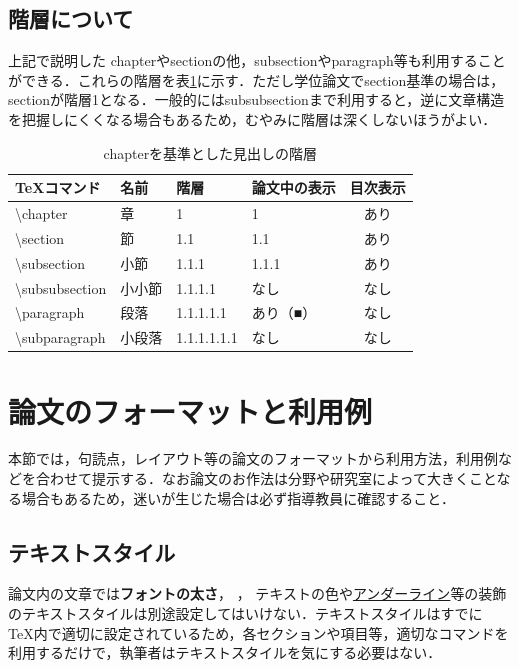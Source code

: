 \documentclass[a4paper,uplatex]{jsarticle}
\begin{document}
\subsection{階層について}
上記で説明した chapterやsectionの他，subsectionやparagraph等も利用することができる．これらの階層を表\ref{tab:kaisou}に示す．ただし学位論文でsection基準の場合は，sectionが階層1となる．一般的にはsubsubsectionまで利用すると，逆に文章構造を把握しにくくなる場合もあるため，むやみに階層は深くしないほうがよい．

\begin{table}[t]
  \caption{chapterを基準とした見出しの階層}
  \label{tab:kaisou}
  \centering
  \begin{tabular}{llllc} %
    \hline
    \TeX コマンド  & 名前  &  階層  & 論文中の表示 & 目次表示\\
    \hline \hline
    \textbackslash{chapter}  & 章   & 1 & 1 & あり\\
    \textbackslash{section}  & 節  & 1.1 & 1.1 & あり\\
    \textbackslash{subsection}  & 小節  & 1.1.1 & 1.1.1 & あり\\
    \textbackslash{subsubsection}  & 小小節  & 1.1.1.1 & なし & なし\\
    \textbackslash{paragraph}  & 段落  & 1.1.1.1.1 & あり（■） & なし\\
    \textbackslash{subparagraph}  & 小段落  & 1.1.1.1.1.1 & なし & なし\\
    \hline
  \end{tabular}
\end{table}


\section{論文のフォーマットと利用例}
本節では，句読点，レイアウト等の論文のフォーマットから利用方法，利用例などを合わせて提示する．なお論文のお作法は分野や研究室によって大きくことなる場合もあるため，迷いが生じた場合は必ず指導教員に確認すること．

\subsection{テキストスタイル}
論文内の文章では\textbf{フォントの太さ}， ， \textcolor[RGB]{200,70,120}{テキストの色}や\underline{アンダーライン}等の装飾のテキストスタイルは別途設定してはいけない．テキストスタイルはすでに \TeX 内で適切に設定されているため，各セクションや項目等，適切なコマンドを利用するだけで，執筆者はテキストスタイルを気にする必要はない．
\end{document}
